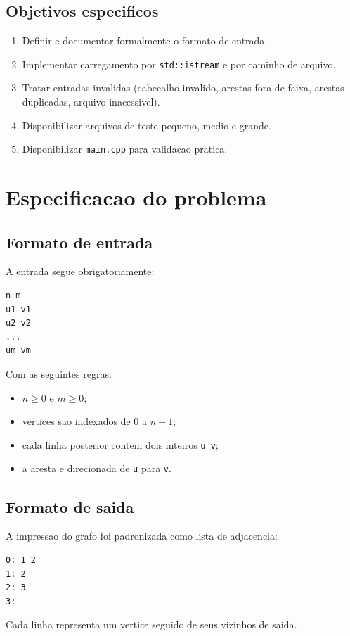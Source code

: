 \documentclass[12pt,a4paper]{article}
\begin{document}
\subsection{Objetivos especificos}
\begin{enumerate}
    \item Definir e documentar formalmente o formato de entrada.
    \item Implementar carregamento por \texttt{std::istream} e por caminho de arquivo.
    \item Tratar entradas invalidas (cabecalho invalido, arestas fora de faixa, arestas duplicadas, arquivo inacessivel).
    \item Disponibilizar arquivos de teste pequeno, medio e grande.
    \item Disponibilizar \texttt{main.cpp} para validacao pratica.
\end{enumerate}

\section{Especificacao do problema}
\subsection{Formato de entrada}
A entrada segue obrigatoriamente:
\begin{verbatim}
n m
u1 v1
u2 v2
...
um vm
\end{verbatim}

Com as seguintes regras:
\begin{itemize}
    \item $n \ge 0$ e $m \ge 0$;
    \item vertices sao indexados de $0$ a $n-1$;
    \item cada linha posterior contem dois inteiros \texttt{u v};
    \item a aresta e direcionada de \texttt{u} para \texttt{v}.
\end{itemize}

\subsection{Formato de saida}
A impressao do grafo foi padronizada como lista de adjacencia:
\begin{verbatim}
0: 1 2
1: 2
2: 3
3:
\end{verbatim}
Cada linha representa um vertice seguido de seus vizinhos de saida.
\end{document}
